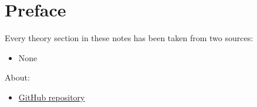 \section*{Preface}

Every theory section in these notes has been taken from two sources:
\begin{itemize}
    \item None
\end{itemize}
About:
\begin{itemize}
    \item[\faIcon{github}] \href{https://github.com/AndreVale69/HPC-E-PoliMI-university-notes}{GitHub repository}
\end{itemize}